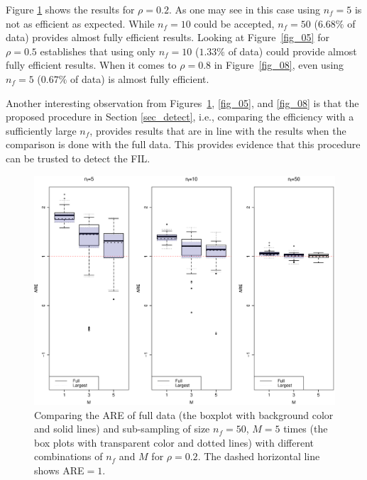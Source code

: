 \documentclass[11pt,a5paper,twoside]{book}
\begin{document}
Figure \ref{fig_02} shows the results for $\rho=0.2$. As one may see in this case using $n_f=5$ is not as efficient as expected. While $n_f=10$ could be accepted, $n_f=50$ ($6.68\%$ of data) provides almost fully efficient results. Looking at Figure~\ref{fig_05} for $\rho=0.5$ establishes that using only $n_f=10$ ($1.33\%$ of data) could provide almost fully efficient results. When it comes to $\rho=0.8$ in Figure~\ref{fig_08}, even using $n_f=5$ ($0.67\%$ of data) is almost fully efficient.

Another interesting observation from Figures~\ref{fig_02}, \ref{fig_05}, and \ref{fig_08} is that the proposed procedure in Section \ref{sec_detect}, i.e., comparing the efficiency with a sufficiently large $n_f$, provides results that are in line with the results when the comparison is done with the full data. This provides evidence that this procedure can be trusted to detect the FIL.
\begin{figure}[!t]
\centering
\includegraphics[width=\textwidth]{fig_02.eps}
\caption[Comparing the ARE of full data and sub-sampling of size $n_f=50$, $M=5$ times with different combinations of $n_f$ and $M$ for $\rho=0.2$.]{Comparing the ARE of full data (the boxplot with background color and solid lines) and sub-sampling of size $n_f=50$, $M=5$ times (the box plots with transparent color and dotted lines) with different combinations of $n_f$ and $M$ for $\rho=0.2$. The dashed horizontal line shows ARE$=1$.} 
\label{fig_02}
\end{figure}  
\end{document}
